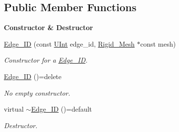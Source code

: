 \subsection*{Public Member Functions}
\begin{Indent}{\bf Constructor \& Destructor}\par
\begin{DoxyCompactItemize}
\item 
\hyperlink{classFVCode3D_1_1Rigid__Mesh_1_1Edge__ID_ab69b89922aaeaceb6c393b99edf7abcb}{Edge\+\_\+\+ID} (const \hyperlink{namespaceFVCode3D_a4bf7e328c75d0fd504050d040ebe9eda}{U\+Int} edge\+\_\+id, \hyperlink{classFVCode3D_1_1Rigid__Mesh}{Rigid\+\_\+\+Mesh} $\ast$const mesh)
\begin{DoxyCompactList}\small\item\em Constructor for a \hyperlink{classFVCode3D_1_1Rigid__Mesh_1_1Edge__ID}{Edge\+\_\+\+ID}. \end{DoxyCompactList}\item 
\hyperlink{classFVCode3D_1_1Rigid__Mesh_1_1Edge__ID_a74231c305881b2ad4788af7245af2f6b}{Edge\+\_\+\+ID} ()=delete
\begin{DoxyCompactList}\small\item\em No empty constructor. \end{DoxyCompactList}\item 
virtual \hyperlink{classFVCode3D_1_1Rigid__Mesh_1_1Edge__ID_a316b9a050d6153bea0debc0cd0cb9d3d}{$\sim$\+Edge\+\_\+\+ID} ()=default
\begin{DoxyCompactList}\small\item\em Destructor. \end{DoxyCompactList}\end{DoxyCompactItemize}
\end{Indent}
